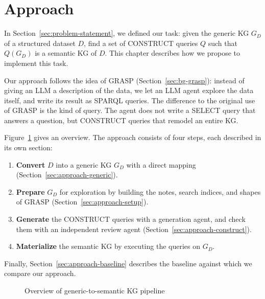 \section{Approach}\label{sec:approach}

In Section~\ref{sec:problem-statement}, we defined our task: given the generic KG \(G_D\) of a structured dataset \(D\), find a set of CONSTRUCT queries \(Q\) such that \(Q(G_D)\) is a semantic KG of \(D\). This chapter describes how we propose to implement this task. 

Our approach follows the idea of GRASP (Section~\ref{sec:bg-grasp}): instead of giving an LLM a description of the data, we let an LLM agent explore the data itself, and write its result as SPARQL queries. The difference to the original use of GRASP is the kind of query. The agent does not write a SELECT query that answers a question, but CONSTRUCT queries that remodel an entire KG\@.

Figure~\ref{fig:approach-pipeline} gives an overview. The approach consists of four steps, each described in its own section:
\begin{enumerate}[leftmargin=*, itemsep=2pt]
  \item \textbf{Convert} \(D\) into a generic KG \(G_D\) with a direct mapping (Section~\ref{sec:approach-generic}).
  \item \textbf{Prepare} \(G_D\) for exploration by building the notes, search indices, and shapes of GRASP (Section~\ref{sec:approach-setup}).
  \item \textbf{Generate} the CONSTRUCT queries with a generation agent, and check them with an independent review agent (Section~\ref{sec:approach-construct}).
  \item \textbf{Materialize} the semantic KG by executing the queries on \(G_D\). 
\end{enumerate}
Finally, Section~\ref{sec:approach-baseline} describes the baseline against which we compare our approach.

\begin{figure}[!htbp]
  \centering
  
  \caption{Overview of generic-to-semantic KG pipeline}
  \label{fig:approach-pipeline}
\end{figure}


